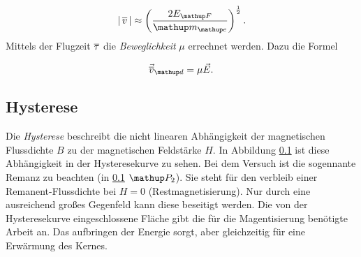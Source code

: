 \begin{equation}
\label{eq:total_v}
\left|\,\overline{v}\,\right|\approx\left(\frac{2E\ua{F}}{\map{m}\ua{e}}\right)^{\frac{1}{2}}.
\end{equation}
Mittels der Flugzeit $\overline{\tau}$ die \emph{Beweglichkeit} $\mu$ errechnet werden.
Dazu die Formel 

\begin{equation}
\label{eq:beweg}
\vec{\ov{v}}\ua{d}=\mu\vec{E}.
\end{equation}

\subsection{Hysterese} 

Die \emph{Hysterese} beschreibt die nicht linearen 
Abhängigkeit der magnetischen Flussdichte $B$ zu der 
magnetischen Feldstärke $H$. In Abbildung \ref{} ist 
diese Abhängigkeit in der Hysteresekurve zu sehen. 
Bei dem Versuch ist die sogennante Remanz zu beachten (in \ref{} $\map{P}_2$).
Sie steht für den verbleib einer Remanent-Flussdichte bei $H=0$ (Restmagnetisierung).
Nur durch eine ausreichend großes Gegenfeld kann diese beseitigt werden.
Die von der Hysteresekurve eingeschlossene Fläche gibt die für die Magentisierung benötigte
Arbeit an. Das aufbringen der Energie sorgt, aber gleichzeitig für eine Erwärmung des Kernes.

